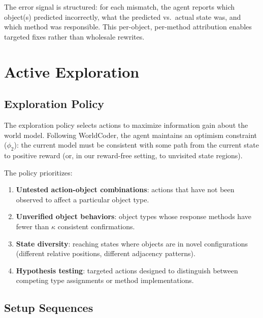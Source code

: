 \documentclass{article}
\begin{document}
The error signal is structured: for each mismatch, the agent reports which
object(s) predicted incorrectly, what the predicted vs.\ actual state was,
and which method was responsible.  This per-object, per-method attribution
enables targeted fixes rather than wholesale rewrites.



\section{Active Exploration}
\label{sec:exploration}

\subsection{Exploration Policy}
\label{sec:explore_policy}

The exploration policy selects actions to maximize information gain about the
world model.  Following WorldCoder, the agent maintains an optimism constraint
($\phi_2$): the current model must be consistent with some path from the
current state to positive reward (or, in our reward-free setting, to unvisited
state regions).

The policy prioritizes:
\begin{enumerate}[nosep]
    \item \textbf{Untested action-object combinations}: actions that have not
          been observed to affect a particular object type.
    \item \textbf{Unverified object behaviors}: object types whose response
          methods have fewer than $\kappa$ consistent confirmations.
    \item \textbf{State diversity}: reaching states where objects are in
          novel configurations (different relative positions, different
          adjacency patterns).
    \item \textbf{Hypothesis testing}: targeted actions designed to
          distinguish between competing type assignments or method
          implementations.
\end{enumerate}

\subsection{Setup Sequences}
\label{sec:setup}
\end{document}
